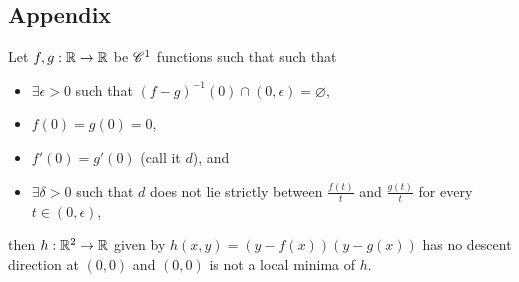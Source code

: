 \subsection*{Appendix}\label{sec3app}

\begin{thm}\label{gen3}
Let $f,g:\mathbb{R}\to \mathbb{R}$ be ${\mathscr{C}}^1$ functions such that  such that \begin{itemize}
\item $\exists\epsilon>0$ such that $(f-g)^{-1}(0)\cap (0,\epsilon)=\varnothing$,
\item $f(0)=g(0)=0$, 
\item $f'(0)=g'(0)$ (call it $d$), and
\item $\exists \delta > 0$ such that $d$ does not lie strictly between $\frac{f(t)}{t}$ and $\frac{g(t)}{t}$ for every $t\in(0,\epsilon)$,
\end{itemize}
then $h:\mathbb{R}^2\to\mathbb{R}$ given by $h(x,y) = (y-f(x))(y-g(x))$ has no descent direction at $(0,0)$ and $(0,0)$ is not a local minima of $h$.
\end{thm}

